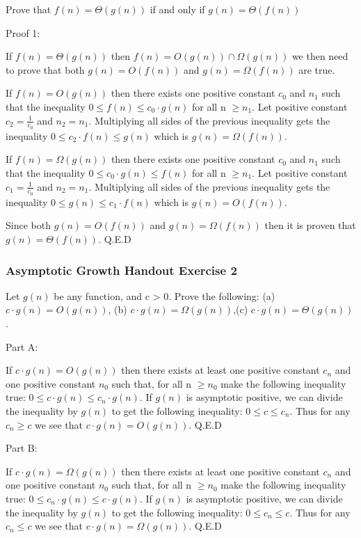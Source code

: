 \documentclass{article}
\begin{document}
Prove that $f(n) = \Theta(g(n))$ if and only if $g(n) = \Theta(f(n))$

Proof 1:

If $f(n) = \Theta(g(n))$ then $f(n) = O(g(n)) \cap \Omega(g(n))$ we then need to prove that both $g(n) = O(f(n))$ and $g(n) = \Omega(f(n))$ are true. 

If $f(n) = O(g(n))$ then there exists one positive constant $c_0$ and $n_1$ such that the inequality $0 \leq f(n) \leq c_0 \cdot g(n)$ for all n $\geq n_1$. Let positive constant $c_2 = \frac{1}{c_0}$ and $n_2 = n_1$. Multiplying all sides of the previous inequality gets the inequality $0 \leq c_2 \cdot f(n) \leq g(n)$ which is $g(n) = \Omega(f(n))$.

If $f(n) = \Omega(g(n))$ then there exists one positive constant $c_0$ and $n_1$ such that the inequality $0 \leq c_0 \cdot g(n) \leq f(n)$ for all n $\geq n_1$. Let positive constant $c_1 = \frac{1}{c_0}$ and $n_2 = n_1$. Multiplying all sides of the previous inequality gets the inequality $0 \leq g(n) \leq c_1 \cdot f(n)$ which is $g(n) = O(f(n))$.

Since both $g(n) = O(f(n))$ and $g(n) = \Omega(f(n))$ then it is proven that $g(n) = \Theta(f(n))$. Q.E.D

\subsubsection{Asymptotic Growth Handout Exercise 2}

Let $g(n)$ be any function, and c > 0. Prove the following: (a) $c \cdot g(n) = O(g(n))$, (b) $c \cdot g(n) = \Omega(g(n))$,(c) $c \cdot g(n) = \Theta(g(n))$. 

Part A:

If $c \cdot g(n) = O(g(n))$ then there exists at least one positive constant $c_n$ and one positive constant $n_0$ such that, for all n $\geq n_0$ make the following inequality true: $0 \leq c \cdot g(n) \leq c_n \cdot g(n)$. If $g(n)$ is asymptotic positive, we can divide the inequality by $g(n)$ to get the following inequality: $0 \leq c \leq c_n$. Thus for any $c_n \geq c$ we see that $c \cdot g(n) = O(g(n))$. Q.E.D

Part B:

If $c \cdot g(n) = \Omega(g(n))$ then there exists at least one positive constant $c_n$ and one positive constant $n_0$ such that, for all n $\geq n_0$ make the following inequality true: $0 \leq c_n \cdot g(n) \leq c \cdot g(n)$. If $g(n)$ is asymptotic positive, we can divide the inequality by $g(n)$ to get the following inequality: $0 \leq c_n \leq c$. Thus for any $c_n \leq c$ we see that $c \cdot g(n) = \Omega(g(n))$. Q.E.D
\end{document}
